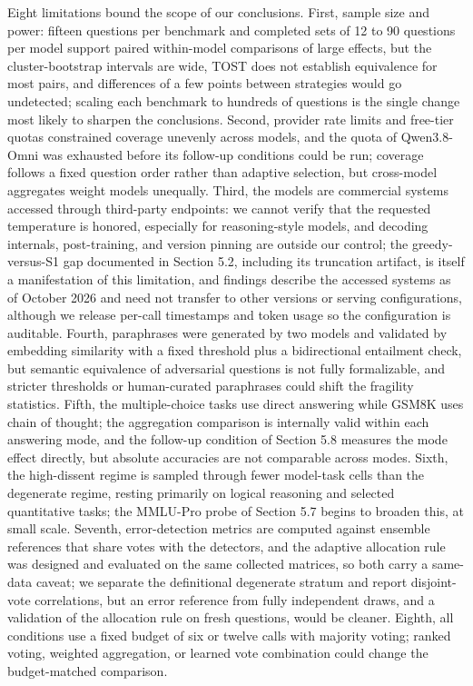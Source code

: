 \documentclass[preprint,12pt]{elsarticle}
\begin{document}
Eight limitations bound the scope of our conclusions. First, sample size and power: fifteen questions per benchmark and completed sets of 12 to 90 questions per model support paired within-model comparisons of large effects, but the cluster-bootstrap intervals are wide, TOST does not establish equivalence for most pairs, and differences of a few points between strategies would go undetected; scaling each benchmark to hundreds of questions is the single change most likely to sharpen the conclusions. Second, provider rate limits and free-tier quotas constrained coverage unevenly across models, and the quota of Qwen3.8-Omni was exhausted before its follow-up conditions could be run; coverage follows a fixed question order rather than adaptive selection, but cross-model aggregates weight models unequally. Third, the models are commercial systems accessed through third-party endpoints: we cannot verify that the requested temperature is honored, especially for reasoning-style models, and decoding internals, post-training, and version pinning are outside our control; the greedy-versus-S1 gap documented in Section 5.2, including its truncation artifact, is itself a manifestation of this limitation, and findings describe the accessed systems as of October 2026 and need not transfer to other versions or serving configurations, although we release per-call timestamps and token usage so the configuration is auditable. Fourth, paraphrases were generated by two models and validated by embedding similarity with a fixed threshold plus a bidirectional entailment check, but semantic equivalence of adversarial questions is not fully formalizable, and stricter thresholds or human-curated paraphrases could shift the fragility statistics. Fifth, the multiple-choice tasks use direct answering while GSM8K uses chain of thought; the aggregation comparison is internally valid within each answering mode, and the follow-up condition of Section 5.8 measures the mode effect directly, but absolute accuracies are not comparable across modes. Sixth, the high-dissent regime is sampled through fewer model-task cells than the degenerate regime, resting primarily on logical reasoning and selected quantitative tasks; the MMLU-Pro probe of Section 5.7 begins to broaden this, at small scale. Seventh, error-detection metrics are computed against ensemble references that share votes with the detectors, and the adaptive allocation rule was designed and evaluated on the same collected matrices, so both carry a same-data caveat; we separate the definitional degenerate stratum and report disjoint-vote correlations, but an error reference from fully independent draws, and a validation of the allocation rule on fresh questions, would be cleaner. Eighth, all conditions use a fixed budget of six or twelve calls with majority voting; ranked voting, weighted aggregation, or learned vote combination could change the budget-matched comparison.
\end{document}
